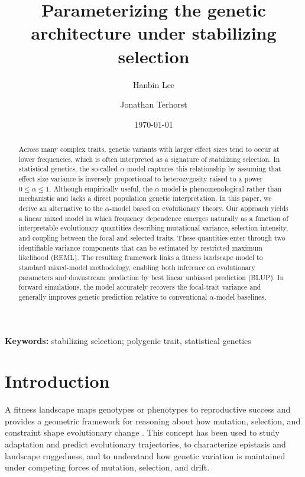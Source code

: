 \documentclass[10pt]{article}
\title{
    Parameterizing the genetic architecture under stabilizing selection
}
\author[1,$*$]{Hanbin Lee}
\author[1,$*$]{Jonathan Terhorst}
\affil[1]{Department of Statistics, University of Michigan, Ann Arbor, MI, 48109, USA}
\affil[$*$]{Correspondence to \texttt{hblee@umich.edu} and \texttt{jonth@umich.edu}}
\date{\today}
\begin{document}
\maketitle

\begin{abstract}
    Across many complex traits, genetic variants with larger effect sizes
    tend to occur at lower frequencies, which is often interpreted as a signature of stabilizing selection.
    In statistical genetics, the so-called $\alpha$-model captures this relationship by assuming that effect size variance is inversely proportional to heterozygosity raised to a power $0\le\alpha\le 1$.
    Although empirically useful, the $\alpha$-model is phenomenological rather than mechanistic and lacks a direct population genetic interpretation.
    In this paper, we derive an alternative to the $\alpha$-model based on evolutionary theory. 
    Our approach yields a linear mixed model in which frequency dependence emerges naturally as a function of interpretable evolutionary quantities describing mutational variance, selection intensity, and coupling between the focal and selected traits.
    These quantities enter through two identifiable variance components that can be estimated by restricted maximum likelihood (REML).
    The resulting framework links a fitness landscape model to standard mixed-model methodology, enabling both inference on evolutionary parameters and downstream prediction by best linear unbiased prediction (BLUP).
    In forward simulations, the model accurately recovers the focal-trait variance and generally improves genetic prediction relative to conventional $\alpha$-model baselines.
\end{abstract}

\vspace{1em} 
\noindent \textbf{Keywords:} stabilizing selection; polygenic trait, statistical genetics

\section{Introduction}
A fitness landscape maps genotypes or phenotypes to reproductive success and provides a geometric framework for reasoning about how mutation, selection, and constraint shape evolutionary change \citep{Tenaillon_2014,de_Visser_2014}. 
This concept has been used to study adaptation and predict evolutionary trajectories, to characterize epistasis and landscape ruggedness, and to understand how genetic variation is maintained under competing forces of mutation, selection, and drift. 
\end{document}
